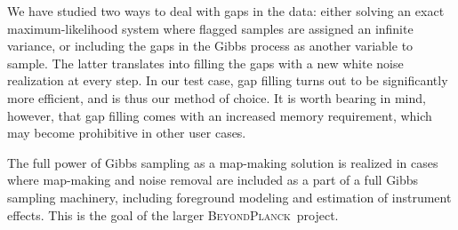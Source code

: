 \documentclass[twocolumn]{aa}
\newcommand{\BP}{\textsc{BeyondPlanck}}
\begin{document}
We have studied two ways to deal with gaps in the data: either solving
an exact maximum-likelihood system where flagged samples are assigned
an infinite variance, or including the gaps in the Gibbs process as
another variable to sample. The latter translates into filling the
gaps with a new white noise realization at every step.
In our test case, gap filling turns out to be significantly more efficient, and is thus our
 method of choice. It is worth bearing in mind, however, that gap filling comes with
 an increased memory requirement, which may become prohibitive in other user cases.

The full power of Gibbs sampling as a map-making solution is realized
in cases where map-making and noise removal are included as a part of
a full Gibbs sampling machinery, including foreground modeling and
estimation of instrument effects. This is the goal of the larger 
\BP\ project.



 


\end{document}
